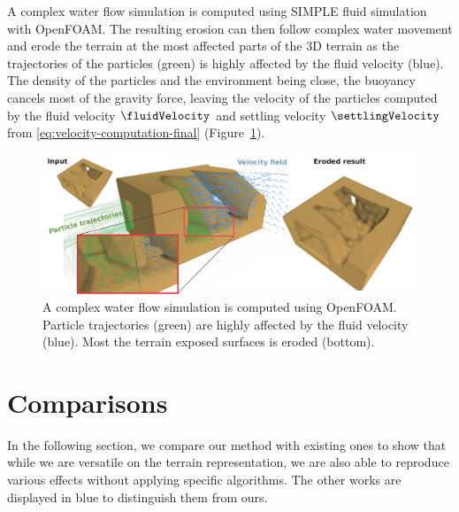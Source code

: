 A complex water flow simulation is computed using SIMPLE \cite{Caretto1973} fluid simulation with OpenFOAM. The resulting erosion can then follow complex water movement and erode the terrain at the most affected parts of the 3D terrain as the trajectories of the particles (green) is highly affected by the fluid velocity (blue). The density of the particles and the environment being close, the buoyancy cancels most of the gravity force, leaving the velocity of the particles computed by the fluid velocity $\fluidVelocity$ and settling velocity $\settlingVelocity$ from \eqref{eq:velocity-computation-final} (Figure~\ref{Erosion-fig:underwater_result}).
\begin{figure}[t]
    
    \centering
    \includegraphics{Results/flowfield.pdf}
    \caption{A complex water flow simulation is computed using OpenFOAM. Particle trajectories (green) are highly affected by the fluid velocity (blue). Most the terrain exposed surfaces is eroded (bottom). }
    \label{Erosion-fig:underwater_result}
\end{figure}
\section{Comparisons}
In the following section, we compare our method with existing ones to show that while we are versatile on the terrain representation, we are also able to reproduce various effects without applying specific algorithms. The other works are displayed in blue to distinguish them from ours.

